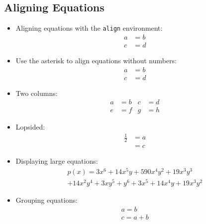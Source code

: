\documentclass{article}
\begin{document}
\subsection{Aligning Equations}
\begin{itemize}
    \item Aligning equations with the \texttt{align} environment: \begin{align}
              a & = b \\
              c & = d
          \end{align}
    \item Use the asterisk to align equations without numbers: \begin{align*}
              a & = b \\
              c & = d
          \end{align*}
    \item Two columns: \begin{align*}
              a & = b & c & = d \\
              e & = f & g & = h
          \end{align*}
    \item Lopsided: \begin{align*}
              \frac{1}{2} & = a \\
                          & = c
          \end{align*}
    \item Displaying large equations: \begin{multline*}
              p(x) = 3x^6 + 14x^5y + 590x^4y^2 + 19x^3y^3 \\
              + 14x^2y^4 + 3xy^5 + y^6 + 3x^5 + 14x^4y + 19x^3y^2
          \end{multline*}
    \item Grouping equations: \begin{gather*}
              a = b \\
              c = a + b
          \end{gather*}
\end{itemize}
\end{document}

